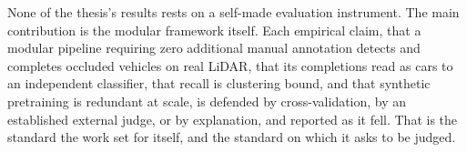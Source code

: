 \documentclass[a4paper,12pt]{report}
\begin{document}
\bigskip

None of the thesis's results rests on a self-made evaluation instrument. The main
contribution is the modular framework itself. Each empirical claim, that a modular
pipeline requiring zero additional manual annotation detects and completes occluded vehicles
on real LiDAR, that its
completions read as cars to an independent classifier, that recall is clustering bound, and that
synthetic pretraining is redundant at scale, is defended by cross-validation, by an
established external judge, or by explanation, and reported as it fell. That is the standard
the work set for itself, and the standard on which it asks to be judged.



\end{document}
